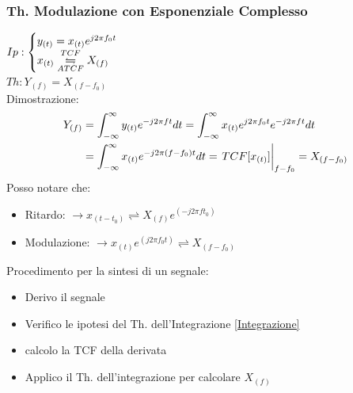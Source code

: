         \subsubsection{Th. Modulazione con Esponenziale Complesso}\label{Modulazione con Esponenziale Complesso}
            $Ip: \begin{cases}
                y_{(t)}= x_{(t)}e^{j2\pi f_0t}\\        
                x_{(t)}\overunderset{TCF}{ATCF}{\leftrightharpoons} X_{(f)}
                \end{cases}$\\
            $Th: Y_{(f)} = X_{(f-f_0)} $ \\
            Dimostrazione: 
            \begin{align}
                Y_{(f)} & = \int_{-\infty}^{\infty} y_{(t)} e^{-j2\pi ft} dt = \int_{-\infty}^{\infty} x_{(t)}e^{j2\pi f_0t} e^{-j2\pi ft} dt \nonumber \\
                & =\int_{-\infty}^{\infty} x_{(t)} e^{-j2\pi (f-f_0)t} dt = \eval{TCF[x_{(t)}]}_{f-f_0} = X_{(f-f_0)} \nonumber
            \end{align}
            Posso notare che:
            \begin{itemize}
                \item Ritardo: $\rightarrow x_{(t-t_0)} \rightleftharpoons X_{(f)} e^{(-j2\pi ft_0)}$
                \item Modulazione: $\rightarrow x_{(t)}e^{(j2\pi f_0t)} \rightleftharpoons X_{(f-f_0)}$
            \end{itemize}
            Procedimento per la sintesi di un segnale:
            \begin{itemize}
                \item Derivo il segnale
                \item Verifico le ipotesi del Th. dell'Integrazione \ref{Integrazione}
                \item calcolo la TCF della derivata
                \item Applico il Th. dell'integrazione per calcolare $X_{(f)}$
            \end{itemize}

